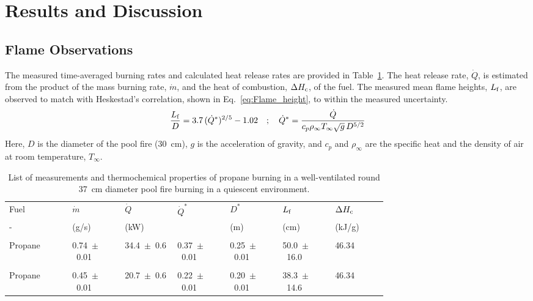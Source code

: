 \documentclass[12pt]{ussci}
\begin{document}
\section{Results and Discussion}
\subsection{Flame Observations}
The measured time-averaged burning rates and calculated heat release rates are provided in Table~\ref{tab:Pool_Fire_Parameters_Table}. The heat release rate, $\dot{Q}$, is estimated from the product of the mass burning rate, $\dot{m}$, and the heat of combustion, $\Delta H_{\rm c}$, of the fuel. The measured mean flame heights, $L_{\rm f}$, are observed to match with Heskestad's correlation, shown in Eq.~\ref{eq:Flame_height}, to within the measured uncertainty.
\begin{equation}\label{eq:Flame_height}
\frac{L_{\rm f}}{D} = 3.7 \, (\dot{Q}^*)^{2/5} - 1.02 \quad ; \quad \dot{Q}^*=\frac{\dot{Q}}{c_{p}\rho_\infty T_\infty \sqrt{g} \, D^{5/2}}
\end{equation}
Here, $D$ is the diameter of the pool fire (30~cm), $g$ is the acceleration of gravity, and $c_p$ and $\rho_\infty$ are the specific heat and the density of air at room temperature, $T_\infty$. 

\begin{table}[!t]
\caption[List of measurements and thermochemical properties of fuels]{List of measurements and thermochemical properties of propane burning in a well-ventilated round 37~cm diameter pool fire burning in a quiescent environment.}
\label{tab:Pool_Fire_Parameters_Table}
\centering
	\footnotesize
	\begin{tabular}{p{0.125\linewidth}p{0.1\linewidth}p{0.1\linewidth}p{0.1\linewidth}p{0.1\linewidth}p{0.1\linewidth}p{0.1\linewidth}}
\hline
{Fuel} &{$\dot{m}$}& { $\dot{Q}$}& {$\dot{Q}^* $}&{$D^*$}&{$L_{\rm f}$}&{$\Delta H_{\rm c}$~\cite{Hurley2016}}\\
{-} &{(\si{g/{s}})}& {(\si{kW})}& {}&{(\si{m})}&{(\si{cm})}&{(kJ/g)}\\
\hline
\\[0.01cm]
Propane		&	0.74~$\pm$~0.01 & 34.4~$\pm$~0.6 & 0.37~$\pm$~0.01 & 0.25~$\pm$~0.01 & 50.0~$\pm$~16.0 & 46.34\\
\\[0.01cm]
Propane		&	0.45~$\pm$~0.01 & 20.7~$\pm$~0.6 &0.22~$\pm$~0.01 & 0.20~$\pm$~0.01 &	38.3~$\pm$~14.6 & 46.34\\
\hline
\end{tabular}
\end{table}
\end{document}
